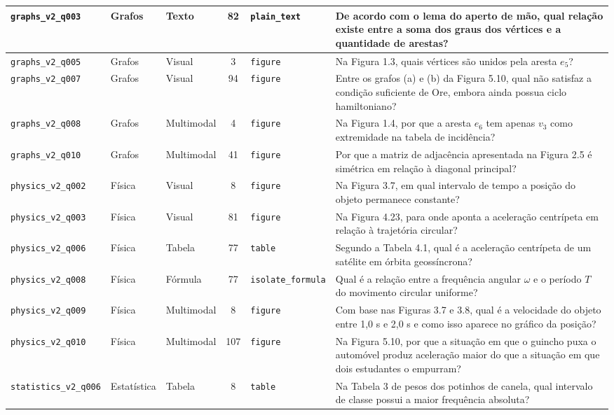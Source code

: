\begin{quadro}[htbp]
\begin{tabularx}{\textwidth}{|l|l|l|c|l|X|}
\hline
\texttt{graphs\_v2\_q003} & Grafos & Texto & 82 & \texttt{plain\_text} & De acordo com o lema do aperto de mão, qual relação existe entre a soma dos graus dos vértices e a quantidade de arestas? \\
\hline
\texttt{graphs\_v2\_q005} & Grafos & Visual & 3 & \texttt{figure} & Na Figura 1.3, quais vértices são unidos pela aresta $e_5$? \\
\hline
\texttt{graphs\_v2\_q007} & Grafos & Visual & 94 & \texttt{figure} & Entre os grafos (a) e (b) da Figura 5.10, qual não satisfaz a condição suficiente de Ore, embora ainda possua ciclo hamiltoniano? \\
\hline
\texttt{graphs\_v2\_q008} & Grafos & Multimodal & 4 & \texttt{figure} & Na Figura 1.4, por que a aresta $e_6$ tem apenas $v_3$ como extremidade na tabela de incidência? \\
\hline
\texttt{graphs\_v2\_q010} & Grafos & Multimodal & 41 & \texttt{figure} & Por que a matriz de adjacência apresentada na Figura 2.5 é simétrica em relação à diagonal principal? \\
\hline
\texttt{physics\_v2\_q002} & Física & Visual & 8 & \texttt{figure} & Na Figura 3.7, em qual intervalo de tempo a posição do objeto permanece constante? \\
\hline
\texttt{physics\_v2\_q003} & Física & Visual & 81 & \texttt{figure} & Na Figura 4.23, para onde aponta a aceleração centrípeta em relação à trajetória circular? \\
\hline
\texttt{physics\_v2\_q006} & Física & Tabela & 77 & \texttt{table} & Segundo a Tabela 4.1, qual é a aceleração centrípeta de um satélite em órbita geossíncrona? \\
\hline
\texttt{physics\_v2\_q008} & Física & Fórmula & 77 & \texttt{isolate\_formula} & Qual é a relação entre a frequência angular $\omega$ e o período $T$ do movimento circular uniforme? \\
\hline
\texttt{physics\_v2\_q009} & Física & Multimodal & 8 & \texttt{figure} & Com base nas Figuras 3.7 e 3.8, qual é a velocidade do objeto entre 1,0 s e 2,0 s e como isso aparece no gráfico da posição? \\
\hline
\texttt{physics\_v2\_q010} & Física & Multimodal & 107 & \texttt{figure} & Na Figura 5.10, por que a situação em que o guincho puxa o automóvel produz aceleração maior do que a situação em que dois estudantes o empurram? \\
\hline
\texttt{statistics\_v2\_q006} & Estatística & Tabela & 8 & \texttt{table} & Na Tabela 3 de pesos dos potinhos de canela, qual intervalo de classe possui a maior frequência absoluta? \\

\end{tabularx}
\end{quadro}
